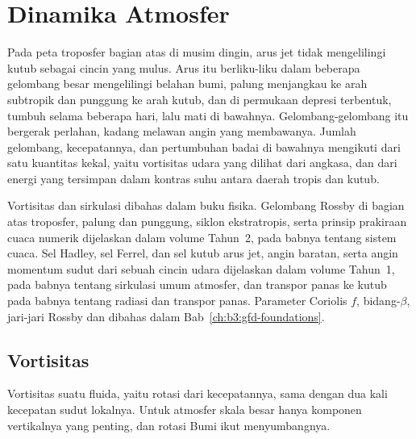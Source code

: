 \chapter{Dinamika Atmosfer}\label{ch:b3:atmospheric-dynamics}

Pada peta troposfer bagian atas di musim dingin, arus jet tidak
mengelilingi kutub sebagai cincin yang mulus. Arus itu berliku-liku dalam beberapa gelombang besar mengelilingi belahan bumi,
palung menjangkau ke arah subtropik dan punggung ke arah
kutub, dan di permukaan depresi terbentuk, tumbuh selama beberapa hari, lalu mati di bawahnya.
Gelombang-gelombang itu bergerak perlahan, kadang melawan angin yang membawanya.
Jumlah gelombang, kecepatannya, dan pertumbuhan badai di bawahnya
mengikuti dari satu kuantitas kekal, yaitu vortisitas udara yang dilihat dari angkasa,
dan dari energi yang tersimpan dalam kontras suhu antara daerah tropis
dan kutub.

\begin{recall}
Vortisitas dan sirkulasi dibahas dalam buku fisika. Gelombang Rossby di bagian atas
troposfer, palung dan punggung, siklon ekstratropis, serta
prinsip prakiraan cuaca numerik dijelaskan dalam volume Tahun~2,
pada babnya tentang sistem cuaca. Sel Hadley, sel Ferrel, dan sel kutub
arus jet, angin baratan, serta angin momentum sudut dari sebuah cincin
udara dijelaskan dalam volume Tahun~1, pada babnya tentang sirkulasi umum
atmosfer, dan transpor panas ke kutub pada babnya tentang
radiasi dan transpor panas. Parameter Coriolis $f$, bidang-$\beta$,
jari-jari Rossby dan  dibahas dalam
Bab~\ref{ch:b3:gfd-foundations}.
\end{recall}

\section{Vortisitas}\label{sec:b3:atmospheric-dynamics:vorticity}

Vortisitas suatu fluida, yaitu rotasi dari kecepatannya, sama dengan dua kali kecepatan
sudut lokalnya. Untuk atmosfer skala besar hanya komponen vertikalnya
yang penting, dan rotasi Bumi ikut menyumbangnya.

